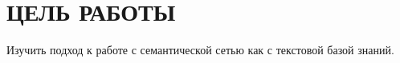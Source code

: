 \section{ЦЕЛЬ РАБОТЫ}

Изучить подход к работе с семантической сетью как с текстовой базой знаний.

